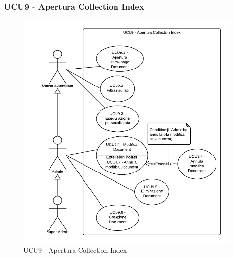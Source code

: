 \subsubsection{UCU9 - Apertura Collection Index}    
    \begin{figure}[H]
      \begin{center}
      \includegraphics[scale=0.16]{UML/UCU9 - Apertura Collection Index.png}
      \caption{UCU9 - Apertura Collection Index}
      \end{center} 
    \end{figure}    
    
